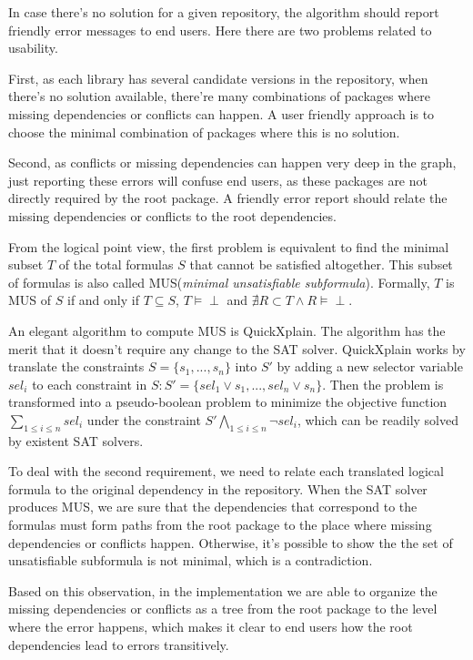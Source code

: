 In case there's no solution for a given repository, the algorithm should report friendly error messages to end users. Here there are two problems related to usability.

First, as each library has several candidate versions in the repository, when there's no solution available, there're many combinations of packages where missing dependencies or conflicts can happen. A user friendly approach is to choose the minimal combination of packages where this is no solution.

Second, as conflicts or missing dependencies can happen very deep in the graph, just reporting these errors will confuse end users, as these packages are not directly required by the root package. A friendly error report should relate the missing dependencies or conflicts to the root dependencies.

From the logical point view, the first problem is equivalent to find the minimal subset $T$ of the total formulas $S$ that cannot be satisfied altogether. This subset of formulas is also called MUS(\emph{minimal unsatisfiable subformula}). Formally, $T$ is MUS of $S$ if and only if $T \subseteq S$, $T \vDash \perp$ and $\nexists R \subset T \wedge R \vDash \perp$.

An elegant algorithm to compute MUS is QuickXplain\cite{junker2004quickxplain}. The algorithm has the merit that it doesn't require any change to the SAT solver. QuickXplain works by translate the constraints $S = \{ s_1, ..., s_n\}$ into $S'$ by adding a new selector variable $sel_i$ to each constraint in $S: S' = \{ sel_1 \vee s_1, ..., sel_n \vee s_n\}$. Then the problem is transformed into a pseudo-boolean problem to minimize the objective function $\sum_{1 \leq i \leq n} sel_i$ under the constraint $S' \bigwedge_{1 \leq i \leq n} \neg sel_i$, which can be readily solved by existent SAT solvers.

To deal with the second requirement, we need to relate each translated logical formula to the original dependency in the repository. When the SAT solver produces MUS, we are sure that the dependencies that correspond to the formulas must form paths from the root package to the place where missing dependencies or conflicts happen. Otherwise, it's possible to show the the set of unsatisfiable subformula is not minimal, which is a contradiction.

Based on this observation, in the implementation we are able to organize the missing dependencies or conflicts as a tree from the root package to the level where the error happens, which makes it clear to end users how the root dependencies lead to errors transitively.
